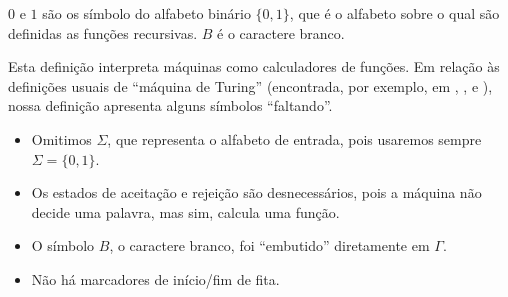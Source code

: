 $0$ e $1$ são os símbolo do alfabeto binário $\{0, 1\}$,
que é o alfabeto sobre o qual são definidas as funções recursivas.
$B$ é o caractere branco.

Esta definição interpreta máquinas como calculadores de funções.
Em relação às definições usuais de ``máquina de Turing''
(encontrada, por exemplo,
em \cite[p.~148]{HopcroftUllman1979},
\cite[p.~140]{Sipser2006},
e \cite[p.~6]{Kozen2006}),
nossa definição apresenta alguns símbolos ``faltando''.
\begin{itemize}
    \setlength{\labelsep}{1ex}
    \item Omitimos $\Sigma$, que representa o alfabeto de entrada,
        pois usaremos sempre $\Sigma = \{0, 1\}$.
    \item Os estados de aceitação e rejeição são desnecessários,
        pois a máquina não decide uma palavra,
        mas sim, calcula uma função.
    \item O símbolo $B$, o caractere branco,
        foi ``embutido'' diretamente em $\Gamma$.
    \item Não há marcadores de início/fim de fita.
\end{itemize}
